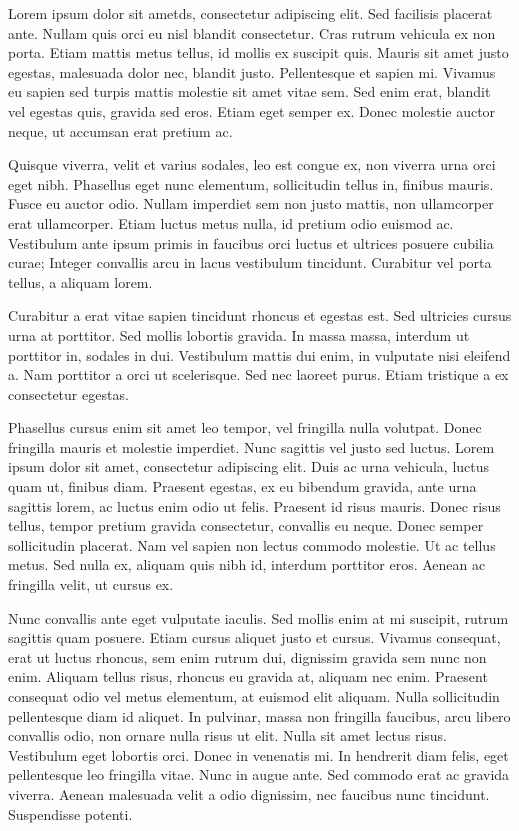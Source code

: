 \documentclass{article}
\begin{document}
Lorem ipsum dolor sit ametds, consectetur adipiscing elit. Sed facilisis placerat ante. Nullam quis orci eu nisl blandit consectetur. Cras rutrum vehicula ex non porta. Etiam mattis metus tellus, id mollis ex suscipit quis. Mauris sit amet justo egestas, malesuada dolor nec, blandit justo. Pellentesque et sapien mi. Vivamus eu sapien sed turpis mattis molestie sit amet vitae sem. Sed enim erat, blandit vel egestas quis, gravida sed eros. Etiam eget semper ex. Donec molestie auctor neque, ut accumsan erat pretium ac.

Quisque viverra, velit et varius sodales, leo est congue ex, non viverra urna orci eget nibh. Phasellus eget nunc elementum, sollicitudin tellus in, finibus mauris. Fusce eu auctor odio. Nullam imperdiet sem non justo mattis, non ullamcorper erat ullamcorper. Etiam luctus metus nulla, id pretium odio euismod ac. Vestibulum ante ipsum primis in faucibus orci luctus et ultrices posuere cubilia curae; Integer convallis arcu in lacus vestibulum tincidunt. Curabitur vel porta tellus, a aliquam lorem.

Curabitur a erat vitae sapien tincidunt rhoncus et egestas est. Sed ultricies cursus urna at porttitor. Sed mollis lobortis gravida. In massa massa, interdum ut porttitor in, sodales in dui. Vestibulum mattis dui enim, in vulputate nisi eleifend a. Nam porttitor a orci ut scelerisque. Sed nec laoreet purus. Etiam tristique a ex consectetur egestas.

Phasellus cursus enim sit amet leo tempor, vel fringilla nulla volutpat. Donec fringilla mauris et molestie imperdiet. Nunc sagittis vel justo sed luctus. Lorem ipsum dolor sit amet, consectetur adipiscing elit. Duis ac urna vehicula, luctus quam ut, finibus diam. Praesent egestas, ex eu bibendum gravida, ante urna sagittis lorem, ac luctus enim odio ut felis. Praesent id risus mauris. Donec risus tellus, tempor pretium gravida consectetur, convallis eu neque. Donec semper sollicitudin placerat. Nam vel sapien non lectus commodo molestie. Ut ac tellus metus. Sed nulla ex, aliquam quis nibh id, interdum porttitor eros. Aenean ac fringilla velit, ut cursus ex.

Nunc convallis ante eget vulputate iaculis. Sed mollis enim at mi suscipit, rutrum sagittis quam posuere. Etiam cursus aliquet justo et cursus. Vivamus consequat, erat ut luctus rhoncus, sem enim rutrum dui, dignissim gravida sem nunc non enim. Aliquam tellus risus, rhoncus eu gravida at, aliquam nec enim. Praesent consequat odio vel metus elementum, at euismod elit aliquam. Nulla sollicitudin pellentesque diam id aliquet. In pulvinar, massa non fringilla faucibus, arcu libero convallis odio, non ornare nulla risus ut elit. Nulla sit amet lectus risus. Vestibulum eget lobortis orci. Donec in venenatis mi. In hendrerit diam felis, eget pellentesque leo fringilla vitae. Nunc in augue ante. Sed commodo erat ac gravida viverra. Aenean malesuada velit a odio dignissim, nec faucibus nunc tincidunt. Suspendisse potenti. 
\end{document}

